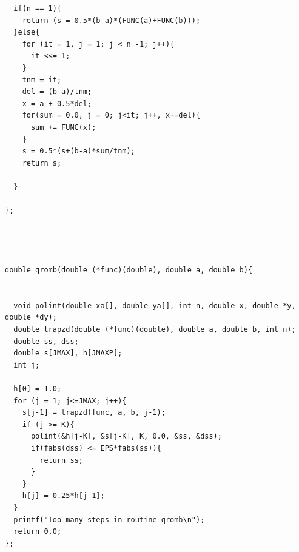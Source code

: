 \documentclass{article}
\begin{document}
\begin{verbatim}
  if(n == 1){
    return (s = 0.5*(b-a)*(FUNC(a)+FUNC(b)));
  }else{
    for (it = 1, j = 1; j < n -1; j++){
      it <<= 1;
    }
    tnm = it;
    del = (b-a)/tnm;
    x = a + 0.5*del;
    for(sum = 0.0, j = 0; j<it; j++, x+=del){
      sum += FUNC(x);
    }
    s = 0.5*(s+(b-a)*sum/tnm);
    return s;

  }

};




double qromb(double (*func)(double), double a, double b){


  void polint(double xa[], double ya[], int n, double x, double *y, double *dy);
  double trapzd(double (*func)(double), double a, double b, int n);
  double ss, dss;
  double s[JMAX], h[JMAXP];
  int j;

  h[0] = 1.0;
  for (j = 1; j<=JMAX; j++){
    s[j-1] = trapzd(func, a, b, j-1);
    if (j >= K){
      polint(&h[j-K], &s[j-K], K, 0.0, &ss, &dss);
      if(fabs(dss) <= EPS*fabs(ss)){
        return ss;
      }
    }
    h[j] = 0.25*h[j-1];
  }
  printf("Too many steps in routine qromb\n");
  return 0.0;
};
\end{verbatim}

\hline
\end{document}
